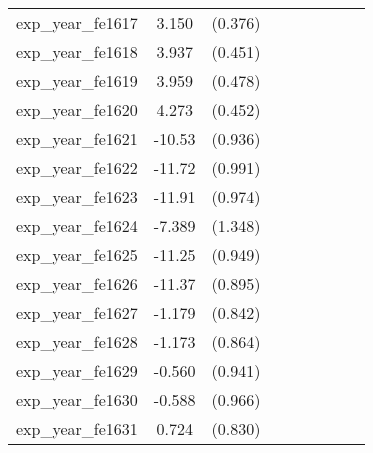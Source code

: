 {\begin{tabular}{l*{4}{cc}}
exp\_year\_fe1617&    3.150\sym{***}&  (0.376)&                  &         &                  &         &                  &         \\
exp\_year\_fe1618&    3.937\sym{***}&  (0.451)&                  &         &                  &         &                  &         \\
exp\_year\_fe1619&    3.959\sym{***}&  (0.478)&                  &         &                  &         &                  &         \\
exp\_year\_fe1620&    4.273\sym{***}&  (0.452)&                  &         &                  &         &                  &         \\
exp\_year\_fe1621&   -10.53\sym{***}&  (0.936)&                  &         &                  &         &                  &         \\
exp\_year\_fe1622&   -11.72\sym{***}&  (0.991)&                  &         &                  &         &                  &         \\
exp\_year\_fe1623&   -11.91\sym{***}&  (0.974)&                  &         &                  &         &                  &         \\
exp\_year\_fe1624&   -7.389\sym{***}&  (1.348)&                  &         &                  &         &                  &         \\
exp\_year\_fe1625&   -11.25\sym{***}&  (0.949)&                  &         &                  &         &                  &         \\
exp\_year\_fe1626&   -11.37\sym{***}&  (0.895)&                  &         &                  &         &                  &         \\
exp\_year\_fe1627&   -1.179         &  (0.842)&                  &         &                  &         &                  &         \\
exp\_year\_fe1628&   -1.173         &  (0.864)&                  &         &                  &         &                  &         \\
exp\_year\_fe1629&   -0.560         &  (0.941)&                  &         &                  &         &                  &         \\
exp\_year\_fe1630&   -0.588         &  (0.966)&                  &         &                  &         &                  &         \\
exp\_year\_fe1631&    0.724         &  (0.830)&                  &         &                  &         &                  &         \\

\end{tabular}}
